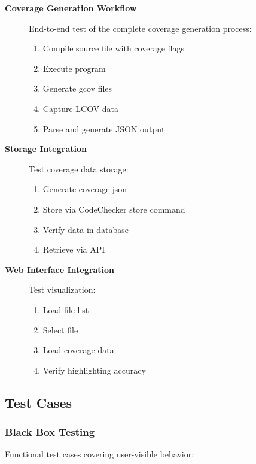 \begin{description}
    \item[\textbf{Coverage Generation Workflow}] End-to-end test of the complete coverage generation process:
    \begin{enumerate}
        \item Compile source file with coverage flags
        \item Execute program
        \item Generate gcov files
        \item Capture LCOV data
        \item Parse and generate JSON output
    \end{enumerate}
    
    \item[\textbf{Storage Integration}] Test coverage data storage:
    \begin{enumerate}
        \item Generate coverage.json
        \item Store via CodeChecker store command
        \item Verify data in database
        \item Retrieve via API
    \end{enumerate}
    
    \item[\textbf{Web Interface Integration}] Test visualization:
    \begin{enumerate}
        \item Load file list
        \item Select file
        \item Load coverage data
        \item Verify highlighting accuracy
    \end{enumerate}
\end{description}

\subsection{Test Cases}

\subsubsection{Black Box Testing}

Functional test cases covering user-visible behavior:

